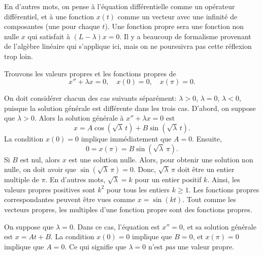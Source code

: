 En d'autres mots, on pense à l'équation différentielle comme un opérateur différentiel, et à une fonction $x(t)$
comme un vecteur avec une infinité de composantes (une pour chaque $t$).
Une fonction propre sera une fonction non nulle $x$ qui satisfait à 
$(L- \lambda)x = 0$. Il y a beaucoup de formalisme provenant de l'algèbre linéaire qui s'applique ici, mais on ne poursuivra pas cette réflexion trop loin.  

\begin{example} \label{bvp:eig1ex}
Trouvons les valeurs propres et les fonctions propres de 
\begin{equation*}
x'' + \lambda x = 0, \quad x(0) = 0, \quad x(\pi) = 0 .
\end{equation*}

On doit considérer chacun des cas suivants séparément: $\lambda > 0$, $\lambda = 0$, $\lambda < 0$, puisque la solution générale est différente dans les trois cas.
D'abord, on suppose que $\lambda > 0$.  Alors la solution générale à $x''+\lambda x = 0$ est
\begin{equation*}
x = A \cos ( \sqrt{\lambda}\, t) + B \sin ( \sqrt{\lambda}\, t).
\end{equation*}
La condition $x(0) = 0$ implique immédiatement que $A = 0$.
Ensuite,
\begin{equation*}
0 = x(\pi) = B \sin ( \sqrt{\lambda}\, \pi ) .
\end{equation*}
Si $B$ est nul, alors $x$ est une solution nulle. Alors, pour obtenir une solution non nulle, on doit avoir que $\sin ( \sqrt{\lambda}\, \pi) = 0$.  Donc,
$\sqrt{\lambda}\, \pi$ doit être un entier multiple de $\pi$.  En d'autres mots,
 $\sqrt{\lambda} = k$ pour un entier positif $k$.
Ainsi, les valeurs propres positives sont 
$k^2$ pour tous les entiers $k \geq 1$.  Les fonctions propres correspondantes peuvent être vues comme $x=\sin (k t)$.  Tout comme les vecteurs propres, les multiples d'une fonction propre sont des fonctions propres. 

On suppose que $\lambda = 0$.  Dans ce cas, l'équation est $x'' = 0$,
et sa solution générale est $x = At + B$.  La condition  $x(0) = 0$ implique que 
 $B=0$, et $x(\pi) = 0$ implique que $A = 0$. Ce qui signifie que $\lambda
= 0$ n'est \emph{pas} une valeur propre.


\end{example}
